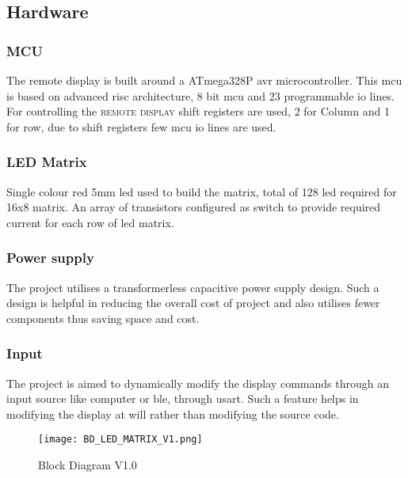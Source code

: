\begin{multicols}{2}
			
		\subsection{Hardware}
			\subsubsection{MCU}
				The remote display is built around a ATmega328P \gls{avr} microcontroller. This \gls{mcu} is based on advanced \gls{risc} \cite{AtMega328P} architecture, 8 bit \gls{mcu} and 23 programmable \gls{io} lines. For controlling the \textsc{remote display} shift registers are used, 2 for Column and 1 for row, due to shift registers few \gls{mcu} \gls{io} lines are used.
			\subsubsection{LED Matrix}
				 Single colour  red 5mm \gls{led} used to build the matrix, total of 128 \gls{led} required for 16x8 matrix. An array of transistors configured as switch to provide required current for each row of \gls{led} matrix.  

			\subsubsection{Power supply}
				The project utilises a transformerless capacitive power supply design. Such a design is helpful in reducing the overall cost of project and also utilises fewer components thus saving space and cost.			
			
			\subsubsection{Input}
				 The project is aimed to dynamically modify the display commands through an input source like computer or \gls{ble}, through \gls{usart}. Such a feature helps in modifying the display at will rather than modifying the source code.

\end{multicols}

\begin{figure*}		
	\texttt{[image: BD\_LED\_MATRIX\_V1.png]}
	\caption{Block Diagram V1.0}	
\end{figure*}	
	
\begin{multicols}{2}

\end{multicols}	 
			
				  



